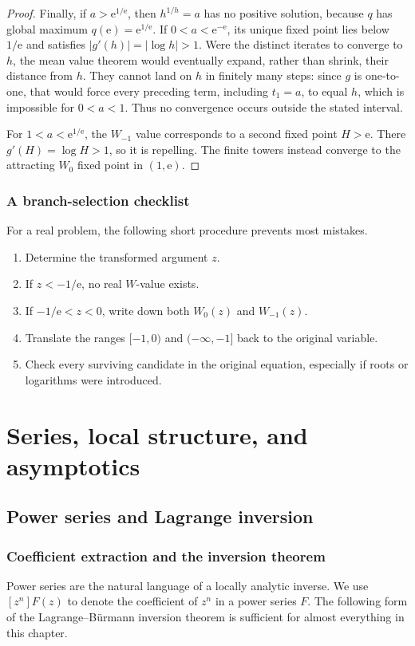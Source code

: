 \documentclass[11pt,openany]{book}
\newcommand{\e}{\mathrm{e}}
\newcommand{\abs}[1]{\left|#1\right|}
\theoremstyle{plain}
\theoremstyle{definition}
\theoremstyle{remark}
\begin{document}
\begin{proof}
Finally, if \(a>\e^{1/\e}\), then \(h^{1/h}=a\) has no positive solution,
because \(q\) has global maximum \(q(\e)=\e^{1/\e}\).  If
\(0<a<\e^{-\e}\), its unique fixed point lies below \(1/\e\) and satisfies
\(\abs{g'(h)}=\abs{\log h}>1\).  Were the distinct iterates to converge to
\(h\), the mean value theorem would eventually expand, rather than shrink,
their distance from \(h\).  They cannot land on \(h\) in finitely many steps:
since \(g\) is one-to-one, that would force every preceding term, including
\(t_1=a\), to equal \(h\), which is impossible for \(0<a<1\).  Thus no
convergence occurs outside the stated interval.

For \(1<a<\e^{1/\e}\), the \(W_{-1}\) value corresponds to a second fixed
point \(H>\e\).  There \(g'(H)=\log H>1\), so it is repelling.  The finite
towers instead converge to the attracting \(W_0\) fixed point in \((1,\e)\).
\end{proof}

\section{A branch-selection checklist}
For a real problem, the following short procedure prevents most mistakes.
\begin{enumerate}[label=\arabic*.]
\item Determine the transformed argument \(z\).
\item If \(z<-1/\e\), no real \(W\)-value exists.
\item If \(-1/\e<z<0\), write down both \(W_0(z)\) and \(W_{-1}(z)\).
\item Translate the ranges \([-1,0)\) and \(( -\infty,-1]\) back to the
      original variable.
\item Check every surviving candidate in the original equation, especially if
      roots or logarithms were introduced.
\end{enumerate}


\part{Series, local structure, and asymptotics}

\chapter{Power series and Lagrange inversion}\label{chap:taylor}

\section{Coefficient extraction and the inversion theorem}
Power series are the natural language of a locally analytic inverse.  We use
\([z^n]F(z)\) to denote the coefficient of \(z^n\) in a power series \(F\).
The following form of the Lagrange--B\"urmann inversion theorem is sufficient
for almost everything in this chapter.
\end{document}

